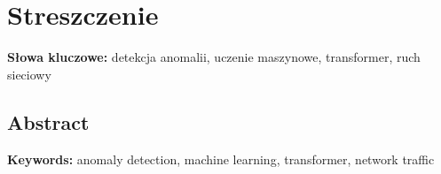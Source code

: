 \chapter*{Streszczenie}
\thispagestyle{plain}


\noindent\textbf{Słowa kluczowe:} detekcja anomalii, uczenie maszynowe, transformer, ruch sieciowy

\begin{otherlanguage}{english}
\chapter*{Abstract}
\thispagestyle{plain}


\noindent\textbf{Keywords:} anomaly detection, machine learning, transformer, network traffic
\end{otherlanguage}
